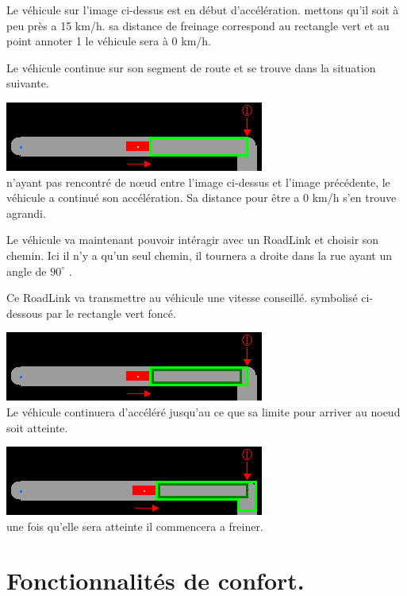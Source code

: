 \documentclass[a4paper,11pt]{article}
\newcommand{\orto}{^{\circ}}
\begin{document}
Le véhicule sur l'image ci-dessus est en début d'accélération. mettons qu'il soit à peu près a 15 km/h. sa distance de freinage correspond au rectangle vert et au point annoter 1 le véhicule sera à 0 km/h.

Le véhicule continue sur son segment de route et se trouve dans la situation suivante.

\vspace{0.25cm}
\includegraphics[scale=0.65]{imgAlgo/dist0km2.png}\\

n'ayant pas rencontré de nœud entre l'image ci-dessus et l'image précédente, le véhicule a continué son accélération. Sa distance pour être a 0 km/h s'en trouve agrandi.

Le véhicule va maintenant pouvoir intéragir avec un RoadLink et choisir son chemin. Ici il n'y a qu'un seul chemin, il tournera a droite dans la rue ayant un angle de $90\orto$ .

Ce RoadLink va transmettre au véhicule une vitesse conseillé. symbolisé ci-dessous par le rectangle vert foncé.

\vspace{0.25cm}
\includegraphics[scale=0.65]{imgAlgo/dist0km3.png}\\

Le véhicule continuera d'accéléré jusqu'au ce que sa limite pour arriver au noeud soit atteinte.

\vspace{0.25cm}
\includegraphics[scale=0.65]{imgAlgo/dist0km4.png}\\

une fois qu'elle sera atteinte il commencera a freiner.

\section{Fonctionnalités de confort.}
\end{document}

